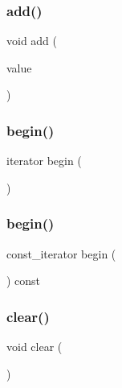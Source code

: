 \subsubsection{\texorpdfstring{add()}{add()}}
{\footnotesize\ttfamily void add (\begin{DoxyParamCaption}\item[{const Value\+Type \&}]{value }\end{DoxyParamCaption})}

\mbox{\label{classStack_ad69bd11391be1a1dba5c8202259664f8}} 
\subsubsection{\texorpdfstring{begin()}{begin()}\hspace{0.1cm}{\footnotesize\ttfamily [1/2]}}
{\footnotesize\ttfamily iterator begin (\begin{DoxyParamCaption}{ }\end{DoxyParamCaption})\hspace{0.3cm}{\ttfamily [inline]}}

\mbox{\label{classStack_a29305669b60ca1680752e2fc3592ba99}} 
\subsubsection{\texorpdfstring{begin()}{begin()}\hspace{0.1cm}{\footnotesize\ttfamily [2/2]}}
{\footnotesize\ttfamily const\+\_\+iterator begin (\begin{DoxyParamCaption}{ }\end{DoxyParamCaption}) const\hspace{0.3cm}{\ttfamily [inline]}}

\mbox{\label{classStack_ac8bb3912a3ce86b15842e79d0b421204}} 
\subsubsection{\texorpdfstring{clear()}{clear()}}
{\footnotesize\ttfamily void clear (\begin{DoxyParamCaption}{ }\end{DoxyParamCaption})}

